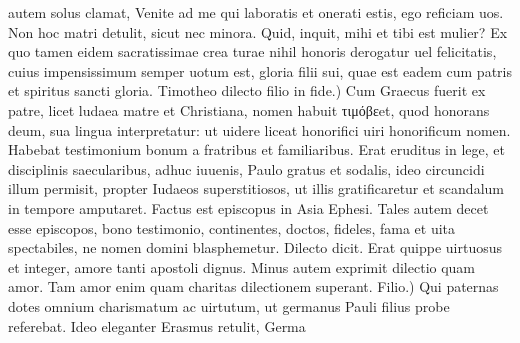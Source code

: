 \documentclass{article}
\begin{document}
\begin{pages}
autem solus clamat, Venite ad me qui laboratis et onerati estis, ego reficiam uos. Non hoc matri detulit, sicut nec minora. Quid, inquit, mihi et tibi est mulier? Ex quo tamen eidem sacratissimae crea turae nihil honoris derogatur uel felicitatis, cuius impensissimum semper uotum est, gloria filii sui, quae est eadem cum patris et spiritus sancti gloria. Timotheo dilecto filio in fide.) Cum Graecus fuerit ex patre, licet ludaea matre et Christiana, nomen habuit τιμόβεet, quod honorans deum, sua lingua interpretatur: ut uidere liceat honorifici uiri honorificum nomen. Habebat testimonium bonum a fratribus et familiaribus. Erat eruditus in lege, et disciplinis saecularibus, adhuc iuuenis, Paulo gratus et sodalis, ideo circuncidi illum permisit, propter Iudaeos superstitiosos, ut illis gratificaretur et scandalum in tempore amputaret. Factus est episcopus in Asia Ephesi. Tales autem decet esse episcopos, bono testimonio, continentes, doctos, fideles, fama et uita spectabiles, ne nomen domini blasphemetur. Dilecto dicit. Erat quippe uirtuosus et integer, amore tanti apostoli dignus. Minus autem exprimit dilectio quam amor. Tam amor enim quam charitas dilectionem superant. Filio.) Qui paternas dotes omnium charismatum ac uirtutum, ut germanus Pauli filius probe referebat. Ideo eleganter Erasmus retulit, Germa\pend

\end{pages}
\end{document}
